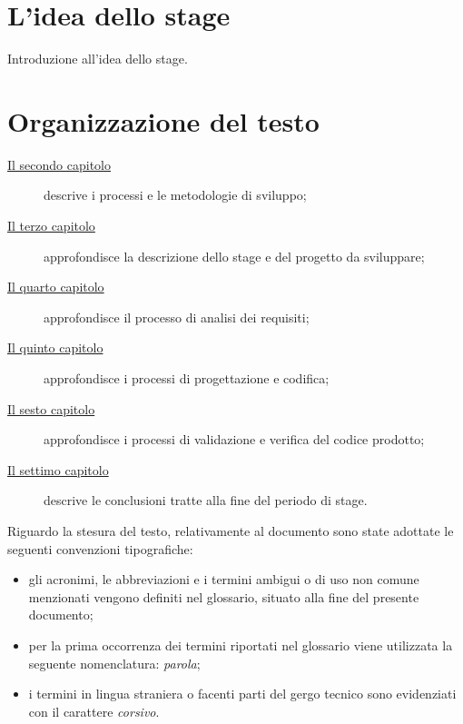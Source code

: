 \section{L'idea dello stage}

Introduzione all'idea dello stage.

\section{Organizzazione del testo}

\begin{description}
    \item[{\hyperref[cap:processi-metodologie]{Il secondo capitolo}}] descrive i processi e le metodologie di sviluppo;
    
    \item[{\hyperref[cap:descrizione-stage]{Il terzo capitolo}}] approfondisce la descrizione dello stage e del progetto da sviluppare;
    
    \item[{\hyperref[cap:analisi-requisiti]{Il quarto capitolo}}] approfondisce il processo di analisi dei requisiti;
    
    \item[{\hyperref[cap:progettazione-codifica]{Il quinto capitolo}}] approfondisce i processi di progettazione e codifica;
    
    \item[{\hyperref[cap:verifica-validazione]{Il sesto capitolo}}] approfondisce i processi di validazione e verifica del codice prodotto;
    
    \item[{\hyperref[cap:conclusioni]{Il settimo capitolo}}] descrive le conclusioni tratte alla fine del periodo di stage.
\end{description}

Riguardo la stesura del testo, relativamente al documento sono state adottate le seguenti convenzioni tipografiche:
\begin{itemize}
	\item gli acronimi, le abbreviazioni e i termini ambigui o di uso non comune menzionati vengono definiti nel glossario, situato alla fine del presente documento;
	\item per la prima occorrenza dei termini riportati nel glossario viene utilizzata la seguente nomenclatura: \emph{parola}\glsfirstoccur;
	\item i termini in lingua straniera o facenti parti del gergo tecnico sono evidenziati con il carattere \emph{corsivo}.
\end{itemize}